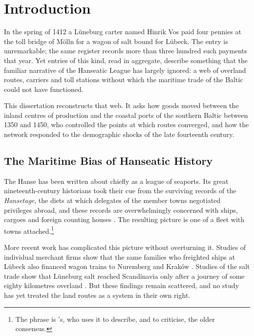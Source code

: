 \chapter{Introduction}
\label{ch:intro}

In the spring of 1412 a Lüneburg carter named Hinrik Vos paid four pennies at the toll bridge of Mölln for a wagon of salt bound for Lübeck. The entry is unremarkable; the same register records more than three hundred such payments that year. Yet entries of this kind, read in aggregate, describe something that the familiar narrative of the Hanseatic League has largely ignored: a web of overland routes, carriers and toll stations without which the maritime trade of the Baltic could not have functioned.

This dissertation reconstructs that web. It asks how goods moved between the inland centres of production and the coastal ports of the southern Baltic between 1350 and 1450, who controlled the points at which routes converged, and how the network responded to the demographic shocks of the late fourteenth century.

\section{The Maritime Bias of Hanseatic History}

The Hanse has been written about chiefly as a league of seaports. Its great nineteenth-century historians took their cue from the surviving records of the \emph{Hansetage}, the diets at which delegates of the member towns negotiated privileges abroad, and these records are overwhelmingly concerned with ships, cargoes and foreign counting houses \parencite{dollinger1964,hammel1988}. The resulting picture is one of a fleet with towns attached.\footnote{The phrase is \textcite{brandt1997}'s, who uses it to describe, and to criticise, the older consensus.}

More recent work has complicated this picture without overturning it. Studies of individual merchant firms show that the same families who freighted ships at Lübeck also financed wagon trains to Nuremberg and Kraków \parencite{selzer2003}. Studies of the salt trade show that Lüneburg salt reached Scandinavia only after a journey of some eighty kilometres overland \parencite{witthoft1976}. But these findings remain scattered, and no study has yet treated the land routes as a system in their own right.

